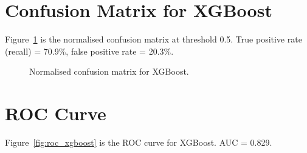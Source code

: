 \documentclass[12pt, a4paper, oneside]{book}
\begin{document}
\section{Confusion Matrix for XGBoost}
Figure~\ref{fig:confusion_xgboost} is the normalised confusion matrix at threshold 0.5. True positive rate (recall) = 70.9\%, false positive rate = 20.3\%.

\begin{figure}[htbp]
\centering
\renewcommand{\arraystretch}{1.4}
\setlength{\tabcolsep}{10pt}
\scriptsize
{}%
\caption{Normalised confusion matrix for XGBoost.}
\label{fig:confusion_xgboost}
\end{figure}

\section{ROC Curve}
Figure~\ref{fig:roc_xgboost} is the ROC curve for XGBoost. AUC = 0.829.
\end{document}
